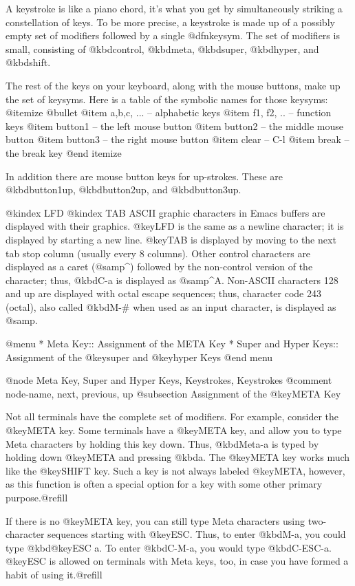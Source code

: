 {{  A keystroke is like a piano chord, it's what you get by simultaneously
striking a constellation of keys.  To be more precise, a keystroke is
made up of a possibly empty set of modifiers followed by a single
@dfn{keysym}. The set of modifiers is small, consisting of
@kbd{control}, @kbd{meta}, @kbd{super}, @kbd{hyper}, and @kbd{shift}.

  The rest of the keys on your keyboard, along with the mouse buttons,
make up the set of keysyms.  Here is a table of the symbolic names for
those keysyms:
@itemize @bullet
@item
a,b,c, ... -- alphabetic keys
@item
f1, f2, .. -- function keys
@item
button1 -- the left mouse button
@item
button2 -- the middle mouse button
@item
button3 -- the right mouse button
@item 
clear -- C-l
@item
break -- the break key
@end itemize

  In addition there are mouse button keys for up-strokes. These are
@kbd{button1up}, @kbd{button2up}, and @kbd{button3up}.

@kindex LFD
@kindex TAB
  ASCII graphic characters in Emacs buffers are displayed with their
graphics.  @key{LFD} is the same as a newline character; it is displayed
by starting a new line.  @key{TAB} is displayed by moving to the next
tab stop column (usually every 8 columns).  Other control characters are
displayed as a caret (@samp{^}) followed by the non-control version of
the character; thus, @kbd{C-a} is displayed as @samp{^A}.  Non-ASCII
characters 128 and up are displayed with octal escape sequences; thus,
character code 243 (octal), also called @kbd{M-#} when used as an input
character, is displayed as @samp{}.

@menu
* Meta Key::             Assignment of the META Key
* Super and Hyper Keys:: Assignment of the @key{super} and @key{hyper} Keys
@end menu

@node Meta Key, Super and Hyper Keys, Keystrokes, Keystrokes
@comment  node-name,  next,  previous,  up
@subsection Assignment of the @key{META} Key
 
  Not all terminals have the complete set of modifiers.  For
example, consider the @key{META} key.  Some terminals have a @key{META}
key, and allow you to type Meta characters by holding this key down.
Thus, @kbd{Meta-a} is typed by holding down @key{META} and pressing
@kbd{a}.  The @key{META} key works much like the @key{SHIFT} key.  Such
a key is not always labeled @key{META}, however, as this function is
often a special option for a key with some other primary purpose.@refill

  If there is no @key{META} key, you can still type Meta characters
using two-character sequences starting with @key{ESC}.  Thus, to enter
@kbd{M-a}, you could type @kbd{@key{ESC} a}.  To enter @kbd{C-M-a}, you
would type @kbd{C-ESC-a}.  @key{ESC} is allowed on terminals with
Meta keys, too, in case you have formed a habit of using it.@refill

}}
